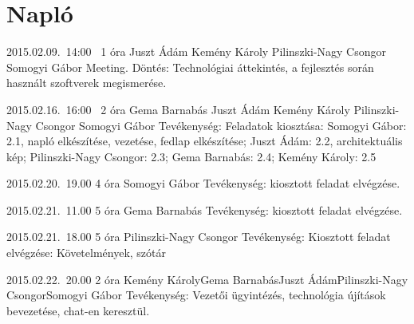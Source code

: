%
\section{Napló}

\begin{naplo}

\bejegyzes
{2015.02.09.~14:00~} %
{1 óra} %
{Juszt Ádám\newline
Kemény Károly\newline
Pilinszki-Nagy Csongor\newline
Somogyi Gábor} %
{Meeting. Döntés: Technológiai áttekintés, a fejlesztés során használt szoftverek megismerése.} %

\bejegyzes
{2015.02.16.~16:00~}
{2 óra}
{Gema Barnabás\newline
	Juszt Ádám\newline
	Kemény Károly\newline
	Pilinszki-Nagy Csongor\newline
	Somogyi Gábor} %
{Tevékenység: Feladatok kiosztása: Somogyi Gábor: 2.1, napló elkészítése, vezetése, fedlap elkészítése; Juszt Ádám: 2.2, architektuális kép; Pilinszki-Nagy Csongor: 2.3; Gema Barnabás: 2.4; Kemény Károly: 2.5}

\bejegyzes
{2015.02.20.~19.00}
{4 óra}
{Somogyi Gábor}
{Tevékenység: kiosztott feladat elvégzése.}

\bejegyzes
{2015.02.21.~11.00}
{5 óra}
{Gema Barnabás}
{Tevékenység: kiosztott feladat elvégzése.}

\bejegyzes
{2015.02.21.~18.00}
{5 óra}
{Pilinszki-Nagy Csongor}
{Tevékenység: \newline Kiosztott feladat elvégzése: Követelmények, szótár}

\bejegyzes
{2015.02.22.~20.00}
{2 óra}
{Kemény Károly\newline Gema Barnabás\newline Juszt Ádám\newline Pilinszki-Nagy Csongor\newline Somogyi Gábor}
{Tevékenység: Vezetői ügyintézés, technológia újítások bevezetése, chat-en keresztül.}


\end{naplo}

